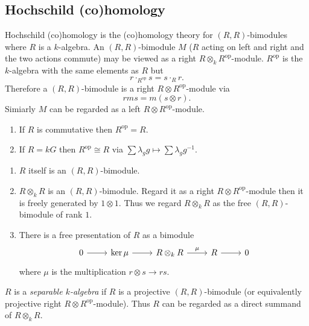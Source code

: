 \documentclass[a4paper]{article}
\newcommand{\op}{\mathrm{op}}
\begin{document}
\subsection{Hochschild (co)homology}

Hochschild (co)homology is the (co)homology theory for \((R, R)\)-bimodules where \(R\) is a \(k\)-algebra. An \((R, R)\)-bimodule \(M\) (\(R\) acting on left and right and the two actions commute) may be viewed as a right \(R \otimes_k R^\op\)-module. \(R^\op\) is the \(k\)-algebra with the same elements as \(R\) but
\[
  r \cdot_{R^\op} s = s \cdot_R r.
\]
Therefore a \((R, R)\)-bimodule is a right \(R \otimes R^\op\)-module via
\[
  rms = m (s \otimes r).
\]
Simiarly \(M\) can be regarded as a left \(R \otimes R^\op\)-module.

\begin{eg}\leavevmode
  \begin{enumerate}
  \item If \(R\) is commutative then \(R^\op = R\).
  \item If \(R = kG\) then \(R^\op \cong R\) via \(\sum \lambda_g g \mapsto \sum \lambda_g g^{-1}\).
  \end{enumerate}
\end{eg}

\begin{note}\leavevmode
  \begin{enumerate}
  \item \(R\) itself is an \((R, R)\)-bimodule.
  \item \(R \otimes_k R\) is an \((R, R)\)-bimodule. Regard it as a right \(R \otimes R^\op\)-module then it is freely generated by \(1 \otimes 1\). Thus we regard \(R \otimes_k R\) as the free \((R, R)\)-bimodule of rank \(1\).
  \item There is a free presentation of \(R\) as a bimodule
    \[
      \begin{tikzcd}
        0 \ar[r] & \ker \mu \ar[r] & R \otimes_k R \ar[r, "\mu"] & R \ar[r] & 0
      \end{tikzcd}
    \]
    where \(\mu\) is the multiplication \(r \otimes s \to rs\).
  \end{enumerate}
\end{note}

\begin{definition}
  \(R\) is a \emph{separable \(k\)-algebra} if \(R\) is a projective \((R, R)\)-bimodule (or equivalently projective right \(R \otimes R^\op\)-module). Thus \(R\) can be regarded as a direct summand of \(R \otimes_k R\).
\end{definition}
\end{document}
